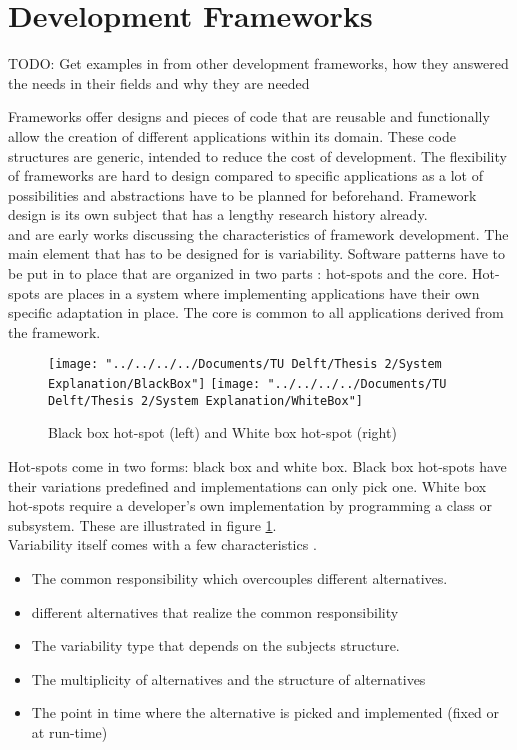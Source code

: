 

\section{Development Frameworks}
TODO: Get examples in from other development frameworks, how they answered the needs in their fields and why they are needed

Frameworks offer designs and pieces of code that are reusable and functionally allow the creation of different applications within its domain. These code structures are generic, intended to reduce the cost of development. The flexibility of frameworks are hard to design compared to specific applications as a lot of possibilities and abstractions have to be planned for beforehand. Framework design is its own subject that has a lengthy research history already. \\

\cite{schmid1997systematic} and \cite{roberts1996evolving} are early works discussing the characteristics of framework development. The main element that has to be designed for is variability. Software patterns have to be put in to place that are organized in two parts \citep{ben2004uml}: hot-spots and the core. Hot-spots are places in a system where implementing applications have their own specific adaptation in place. The core is common to all applications derived from the framework. \\

\begin{figure}
	\centering
	\texttt{[image: "../../../../Documents/TU Delft/Thesis 2/System Explanation/BlackBox"]}
	\texttt{[image: "../../../../Documents/TU Delft/Thesis 2/System Explanation/WhiteBox"]}	\caption[Black White Box Hot Spot]{Black box hot-spot (left) and White box hot-spot (right)}
	\label{fig:blackbox}
\end{figure}

Hot-spots come in two forms: black box and white box. Black box hot-spots have their variations predefined and implementations can only pick one. White box hot-spots require a developer's own implementation by programming a class or subsystem. These are illustrated in figure \ref{fig:blackbox}.\\

Variability itself comes with a few characteristics \citep{schmid1997systematic}. 
\begin{itemize}
	\item The common responsibility which overcouples different alternatives.
	\item different alternatives that realize the common responsibility
	\item The variability type that depends on the subjects structure.
	\item The multiplicity of alternatives and the structure of alternatives
	\item The point in time where the alternative is picked and implemented (fixed or at run-time)
\end{itemize}

